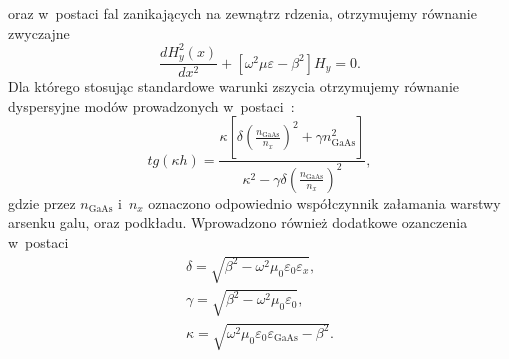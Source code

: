 oraz w~postaci fal zanikających na zewnątrz rdzenia, otrzymujemy równanie zwyczajne
\begin{equation}
	\frac{d H_y^2(x)}{dx^2} + [ \omega^2 \mu \varepsilon - \beta^2 ] H_y = 0.
\end{equation}
Dla którego stosując standardowe warunki zszycia otrzymujemy równanie dyspersyjne modów prowadzonych w~postaci~\cite{petykiewicz1989podstawy}:
\begin{equation}
tg( \kappa h)=\frac{\kappa [ \delta (\frac{n_{\textrm{GaAs}}}{n_x})^2 + \gamma n_{\textrm{GaAs}}^2 ]}{\kappa^2 - \gamma \delta (\frac{n_{\textrm{GaAs}}}{n_x })^2},
\label{eq:tm-disp}
\end{equation}
gdzie przez $n_{\textrm{GaAs}}$ i~$n_x$ oznaczono odpowiednio współczynnik załamania warstwy arsenku galu, oraz podkładu. Wprowadzono również dodatkowe ozanczenia w~postaci
\begin{equation}
	\begin{gathered}
		\delta=\sqrt{\beta^2-\omega^2 \mu_0 \varepsilon_0 \varepsilon_x},\\
		\gamma=\sqrt{\beta^2-\omega^2 \mu_0 \varepsilon_0},\\
		\kappa=\sqrt{\omega^2 \mu_0 \varepsilon_0 \varepsilon_{\textrm{GaAs}} - \beta^2}.
	\end{gathered}
\end{equation}

